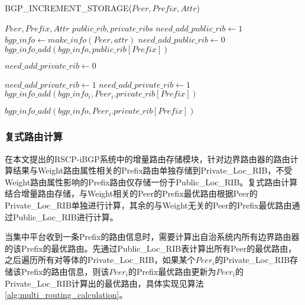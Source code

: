 \begin{algorithm}[!h]
    \caption{BGP\_INCREMENT\_STORAGE($Peer, Prefix, Attr$)}%
    \label{alg:incre_storage}
    \begin{algorithmic}[1]%
        \REQUIRE
        $Peer, Prefix, Attr$
        \ENSURE
        $public\_rib, private\_ribs$
        \STATE $need\_add\_public\_rib \gets 1$
        \STATE $bgp\_info \gets make\_info(Peer, attr)$
        \STATE $need\_add\_public\_rib \gets 0$
        \ENDIF
        \STATE $bgp\_info\_add(bgp\_info, public\_rib[Prefix])$
        \ENDIF

        \STATE $need\_add\_private\_rib \gets 0$

        \STATE $need\_add\_private\_rib \gets 1$
        \ENDIF
        \STATE $need\_add\_private\_rib \gets 1$
        \STATE $bgp\_info\_add(bgp\_info_i, Peer_i.private\_rib[Prefix])$
        \ENDFOR
        \ENDIF

        \STATE $bgp\_info\_add(bgp\_info, Peer_i.private\_rib[Prefix])$
        \ENDIF

        \ENDFOR
    \end{algorithmic}
\end{algorithm}


\subsubsection{复式路由计算}


在本文提出的RSCP-iBGP系统中的增量路由存储模块，针对边界路由器的路由计算结果与Weight路由属性相关的Prefix路由单独存储到Private\_Loc\_RIB，不受Weight路由属性影响的Prefix路由仅存储一份于Public\_Loc\_RIB。复式路由计算结合增量路由存储，与Weight相关的Peer的Prefix最优路由根据Peer的Private\_Loc\_RIB单独进行计算，其余的与Weight无关的Peer的Prefix最优路由通过Public\_Loc\_RIB进行计算。

当集中平台收到一条Prefix的路由信息时，需要计算出自治系统内所有边界路由器的该Prefix的最优路由。先通过Public\_Loc\_RIB表计算出所有Peer的最优路由，之后遍历所有对等体的Private\_Loc\_RIB，如果某个$Peer_i$的Private\_Loc\_RIB存储该Prefix的路由信息，则该$Peer_i$的Prefix最优路由更新为$Peer_i$的Private\_Loc\_RIB计算出的最优路由，具体实现见算法\ref{alg:multi_routing_calculation}。

